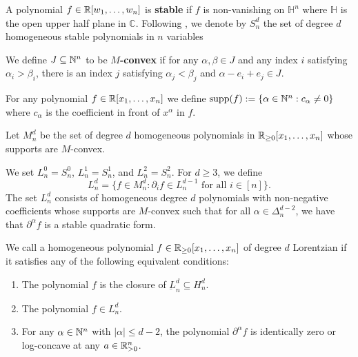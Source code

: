\documentclass{puthesis-UG}
\begin{document}
\begin{defn}
	A polynomial $f \in \mathbb{R}[w_1, \ldots, w_n]$ is \textbf{stable} if $f$ is non-vanishing on $\mathbb{H}^n$ where $\mathbb{H}$ is the open upper half plane in $\mathbb{C}$. Following \cite{milnor-numbers}, we denote by $S_n^d$ the set of degree $d$ homogeneous stable polynomials in $n$ variables 
\end{defn}

\begin{defn}
	We define $J \subseteq \mathbb{N}^n$ to be \textbf{$M$-convex} if for any $\alpha, \beta \in J$ and any index $i$ satisfying $\alpha_i > \beta_i$, there is an index $j$ satisfying $\alpha_j < \beta_j$ and $\alpha - e_i + e_j \in J$. 
\end{defn}

\begin{defn}
	For any polynomial $f \in \mathbb{R}[x_1, \ldots, x_n]$ we define $\text{supp}(f) := \{\alpha \in \mathbb{N}^n : c_\alpha \neq 0\}$ where $c_\alpha$ is the coefficient in front of $x^\alpha$ in $f$. 
\end{defn}

\begin{defn}
	Let $M_n^d$ be the set of degree $d$ homogeneous polynomials in $\mathbb{R}_{\geq 0}[x_1, \ldots, x_n]$ whose supports are $M$-convex.  
\end{defn}



\begin{defn}
	We set $L_n^0 = S_n^0$, $L_n^1 = S_n^1$, and $L_n^2 = S_n^2$. For $d \geq 3$, we define 
	\[
		L_n^d = \{f \in M_n^d : \partial_i f \in L_n^{d-1} \text{ for all } i \in [n]\}.
	\]
	The set $L_n^d$ consists of homogeneous degree $d$ polynomials with non-negative coefficients whose supports are $M$-convex such that for all $\alpha \in \Delta_n^{d-2}$, we have that $\partial^\alpha f$ is a stable quadratic form. 
\end{defn}

\begin{defn} \label{defn-lorentzian}
	We call a homogeneous polynomial $f \in \mathbb{R}_{\geq 0}[x_1, \ldots, x_n]$ of degree $d$ Lorentzian if it satisfies any of the following equivalent conditions:
	\begin{enumerate}[label = (\roman*)]
		\item The polynomial $f$ is the closure of $\underbar{L}_n^d \subseteq H_n^d$. 

		\item The polynomial $f \in L_n^d$. 

		\item For any $\alpha \in \mathbb{N}^n$ with $|\alpha| \leq d-2$, the polynomial $\partial^\alpha f$ is identically zero or log-concave at any $a \in \mathbb{R}_{>0}^n$. 
	\end{enumerate}
\end{defn}
\end{document}
